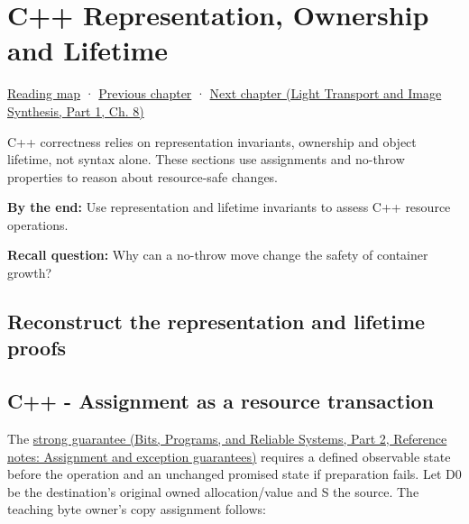 \chapter{C++ Representation, Ownership and Lifetime}\label{03-visual-computing-i-ch018-c-representation-ownership-and-lifetime}\hypertarget{03-visual-computing-i-ch018}{}\label{stagechapter:03-visual-computing-i-ch018}

\hypertarget{03-visual-computing-i-ch018-c-representation-ownership-and-lifetime}{}

\hyperref[volume-reading-map]{Reading map} · \hyperref[03-visual-computing-i-ch017-build-test-and-reproduce-the-program]{Previous chapter} · \href{../04-Light-Transport-and-Image-Synthesis-P01/main.pdf\#nameddest=03-visual-computing-i-ch019-textures-as-sampled-surface-signals}{Next chapter (Light Transport and Image Synthesis, Part 1, Ch. 8)}

C++ correctness relies on representation invariants, ownership and object lifetime, not syntax alone. These sections use assignments and no-throw properties to reason about resource-safe changes.

\textbf{By the end:} Use representation and lifetime invariants to assess C++ resource operations.

\textbf{Recall question:} Why can a no-throw move change the safety of container growth?

\section{Reconstruct the representation and lifetime proofs}\label{03-visual-computing-i-ch018-reconstruct-the-representation-and-lifetime-proofs}

\hypertarget{03-visual-computing-i-ch018-reconstruct-the-representation-and-lifetime-proofs}{}

\section{C++ - Assignment as a resource transaction}\label{03-visual-computing-i-ch018-c---assignment-as-a-resource-transaction}

\hypertarget{03-visual-computing-i-ch018-c---assignment-as-a-resource-transaction}{}

The \href{../01-Bits-Programs-and-Reliable-Systems-P02/main.pdf\#nameddest=appendix-bea6beb5350f}{strong guarantee (Bits, Programs, and Reliable Systems, Part 2, Reference notes: Assignment and exception guarantees)} requires a defined observable state before the operation and an unchanged promised state if preparation fails. Let D0 be the destination's original owned allocation/value and S the source. The teaching byte owner's copy assignment follows:

